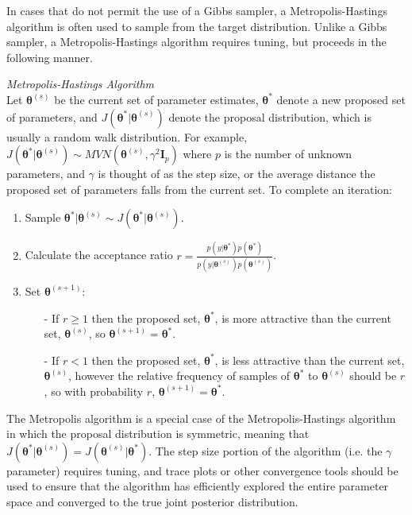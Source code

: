 \documentclass[12pt]{article}\usepackage[]{graphicx}\usepackage[]{color}
\begin{document}
In cases that do not permit the use of a Gibbs sampler, a Metropolis-Hastings algorithm is often used to sample from the target distribution. Unlike a Gibbs sampler, a Metropolis-Hastings algorithm requires tuning, but proceeds in the following manner. 

\begin{mdframed}
\textit{Metropolis-Hastings Algorithm} \\
Let $\bm{\theta}^{(s)}$ be the current set of parameter estimates, $\bm{\theta}^*$ denote a new proposed set of parameters, and $J(\bm{\theta}^*|\bm{\theta}^{(s)})$ denote the proposal distribution, which is usually a random walk distribution. For example, $J(\bm{\theta}^*|\bm{\theta}^{(s)}) \sim MVN(\bm{\theta}^{(s)}, \gamma^2 \bm{I}_p)$ where $p$ is the number of unknown parameters, and $\gamma$ is thought of as the step size, or the average distance the proposed set of parameters falls from the current set. To complete an iteration: 
\begin{enumerate}
\item Sample $\bm{\theta}^*|\bm{\theta}^{(s)} \sim J(\bm{\theta}^*|\bm{\theta}^{(s)})$. 
\item Calculate the acceptance ratio $r = \frac{p(y|\bm{\theta}^*)p(\bm{\theta}^*)}{p(y|\bm{\theta}^{(s)})p(\bm{\theta}^{(s)})}$. 
\item Set $\bm{\theta}^{(s+1)}$:
\begin{itemize}
\item[-] If $r \geq 1$ then the proposed set, $\bm{\theta}^*$, is more attractive than the current set, $\bm{\theta}^{(s)}$, so $\bm{\theta}^{(s+1)} =   \bm{\theta}^*$. 
\item[-] If $r < 1$ then the proposed set, $\bm{\theta}^*$, is less attractive than the current set, $\bm{\theta}^{(s)}$, however the relative frequency of samples of $\bm{\theta}^*$ to $\bm{\theta}^{(s)}$ should be $r$, so with probability $r$, $\bm{\theta}^{(s+1)} = \bm{\theta}^*$.
\end{itemize}
\end{enumerate}
\end{mdframed}
  
\noindent The Metropolis algorithm is a special case of the Metropolis-Hastings algorithm in which the proposal distribution is symmetric, meaning that $J(\bm{\theta}^*|\bm{\theta}^{(s)}) = J(\bm{\theta}^{(s)}|\bm{\theta}^*)$. The step size portion of the algorithm (i.e. the $\gamma$ parameter) requires tuning, and trace plots or other convergence tools should be used to ensure that the algorithm has efficiently explored the entire parameter space and converged to the true joint posterior distribution. 
\end{document}
